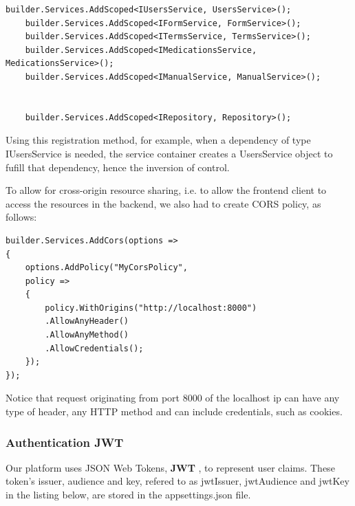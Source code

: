 \begin{lstlisting}[style=sharpc]
	builder.Services.AddScoped<IUsersService, UsersService>();
	builder.Services.AddScoped<IFormService, FormService>();
	builder.Services.AddScoped<ITermsService, TermsService>();
	builder.Services.AddScoped<IMedicationsService, MedicationsService>();
	builder.Services.AddScoped<IManualService, ManualService>();


	builder.Services.AddScoped<IRepository, Repository>();
\end{lstlisting}

Using this registration method, for example, when a dependency of type IUsersService is needed, the service container creates a UsersService object to fufill that dependency, hence the inversion of control.

To allow for cross-origin resource sharing, i.e. to allow the frontend client to access the resources in the backend, we also had to create CORS policy, as follows:

\begin{lstlisting}[style=sharpc]
builder.Services.AddCors(options =>
{
	options.AddPolicy("MyCorsPolicy",
	policy =>
	{
		policy.WithOrigins("http://localhost:8000")
		.AllowAnyHeader()
		.AllowAnyMethod()
		.AllowCredentials();
	});
});
\end{lstlisting}

Notice that request originating from port 8000 of the localhost ip can have any type of header, any HTTP method and can include credentials, such as cookies.
\newpage
\subsubsection{Authentication JWT}

Our platform uses JSON Web Tokens, \textbf{JWT} \cite{rfc7519}, to represent user claims.
These token's issuer, audience and key, refered to as jwtIssuer, jwtAudience and jwtKey in the listing below, are stored in the appsettings.json file.

